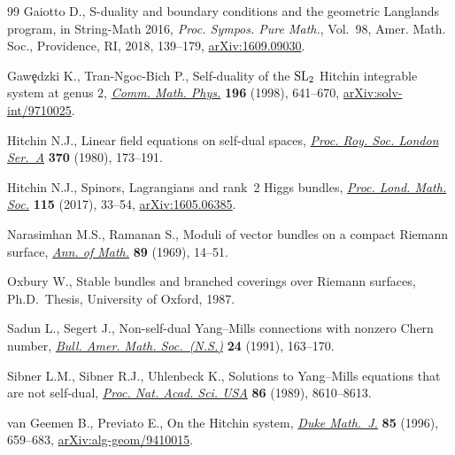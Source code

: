 \documentclass[pdftex]{sigma}
\begin{document}
\begin{thebibliography}{99}
Gaiotto D., S-duality and boundary conditions and the geometric {L}anglands
 program, in String-{M}ath 2016, \textit{Proc. Sympos. Pure Math.}, Vol.~98,
 Amer. Math. Soc., Providence, RI, 2018, 139--179, \href{https://arxiv.org/abs/1609.09030}{arXiv:1609.09030}.

Gaw\c{e}dzki K., Tran-Ngoc-Bich P., Self-duality of the {${\rm SL}_2$}
 {H}itchin integrable system at genus {$2$}, \href{https://doi.org/10.1007/s002200050438}{\textit{Comm. Math. Phys.}}
 \textbf{196} (1998), 641--670, \href{https://arxiv.org/abs/solv-int/9710025}{arXiv:solv-int/9710025}.

Hitchin N.J., Linear field equations on self-dual spaces, \href{https://doi.org/10.1098/rspa.1980.0028}{\textit{Proc. Roy.
 Soc. London Ser.~A}} \textbf{370} (1980), 173--191.

Hitchin N.J., Spinors, {L}agrangians and rank~2 {H}iggs bundles, \href{https://doi.org/10.1112/plms.12034}{\textit{Proc.
 Lond. Math. Soc.}} \textbf{115} (2017), 33--54, \href{https://arxiv.org/abs/1605.06385}{arXiv:1605.06385}.

Narasimhan M.S., Ramanan S., Moduli of vector bundles on a compact {R}iemann
 surface, \href{https://doi.org/10.2307/1970807}{\textit{Ann. of Math.}} \textbf{89} (1969), 14--51.

Oxbury W., Stable bundles and branched coverings over {R}iemann surfaces, Ph.D.~Thesis, {U}niversity of Oxford, 1987.

Sadun L., Segert J., Non-self-dual {Y}ang--{M}ills connections with nonzero
 {C}hern number, \href{https://doi.org/10.1090/S0273-0979-1991-15978-1}{\textit{Bull. Amer. Math. Soc.~(N.S.)}} \textbf{24} (1991), 163--170.

Sibner L.M., Sibner R.J., Uhlenbeck K., Solutions to {Y}ang--{M}ills equations
 that are not self-dual, \href{https://doi.org/10.1073/pnas.86.22.8610}{\textit{Proc. Nat. Acad. Sci. USA}} \textbf{86}
 (1989), 8610--8613.

van Geemen B., Previato E., On the {H}itchin system, \href{https://doi.org/10.1215/S0012-7094-96-08525-7}{\textit{Duke Math.~J.}}
 \textbf{85} (1996), 659--683, \href{https://arxiv.org/abs/alg-geom/9410015}{arXiv:alg-geom/9410015}.

\end{thebibliography}\LastPageEnding
\end{document}
